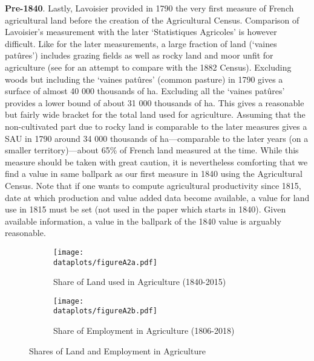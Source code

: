 \documentclass[11pt]{report}
\newcommand{\dataplots}{../output/data/plots}
\begin{document}
\noindent \textbf{Pre-1840}. Lastly, Lavoisier provided in 1790 the very first measure of French agricultural land before the creation of the Agricultural Census. Comparison of Lavoisier's measurement with the later `Statistiques Agricoles' is however difficult. Like for the later measurements, a large fraction of land (`vaines patûres') includes grazing fields as well as rocky land and moor unfit for agriculture (see \cite{mauguin1890statistique} for an attempt to compare with the 1882 Census). Excluding woods but including the `vaines patûres' (common pasture) in 1790 gives a surface of almost 40 000 thousands of ha. Excluding all the `vaines patûres' provides a lower bound of about 31 000 thousands of ha. This gives a reasonable but fairly wide bracket for the total land used for agriculture. Assuming that the non-cultivated part due to rocky land is comparable to the later measures gives a SAU in 1790 around 34 000 thousands of ha---comparable to the later years (on a smaller territory)---about 65\% of French land measured at the time. While this measure should be taken with great caution, it is nevertheless comforting that we find a value in same ballpark as our first measure in 1840 using the Agricultural Census. Note that if one wants to compute agricultural productivity since 1815, date at which production and value added data become available, a value for land use in 1815 must be set (not used in the paper which starts in 1840). Given available information, a value in the ballpark of the 1840 value is arguably reasonable.



\begin{figure}	
	\hspace{-15mm}
	\begin{subfigure}{0.55\textwidth}
			\texttt{[image: \\dataplots/figureA2a.pdf]}
		\vspace{-0.65cm}
		\caption{Share of Land used in Agriculture (1840-2015)\label{A-fig:shares_land_long}}
	\end{subfigure}%
	\hspace{5mm}
	\begin{subfigure}{0.55\textwidth}
			\texttt{[image: \\dataplots/figureA2b.pdf]}
		\vspace{-0.65cm}
		\caption{Share of Employment in Agriculture (1806-2018)}\label{A-fig:shares_emp_long}
	\end{subfigure}%
	\vspace{-0.1cm}
	\caption{Shares of Land and Employment in Agriculture}
\end{figure}
\end{document}
